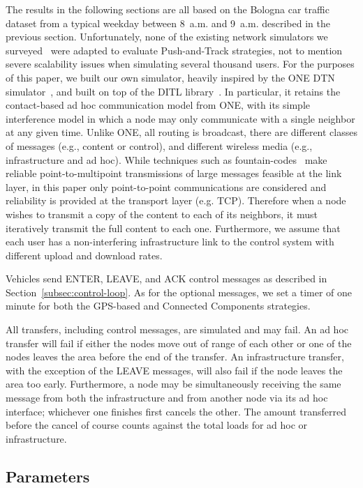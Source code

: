 \documentclass[preprint]{elsarticle}
\begin{document}
The results in the following sections are all based on the Bologna car traffic dataset from a typical weekday between 8~a.m. and 9~a.m. described in the previous section. Unfortunately, none of the existing network simulators we surveyed~\cite{ONE,ns3} were adapted to evaluate Push-and-Track strategies, not to mention severe scalability issues when simulating several thousand users. For the purposes of this paper, we built our own simulator, heavily inspired by the ONE DTN simulator~\cite{ONE}, and built on top of the DITL library~\cite{DITL}. In particular, it retains the contact-based ad hoc communication model from ONE, with its simple interference model in which a node may only communicate with a single neighbor at any given time. Unlike ONE, all routing is broadcast, there are different classes of messages (e.g., content or control), and different wireless media (e.g., infrastructure and ad hoc). While techniques such as fountain-codes~\cite{Luby2002} make reliable point-to-multipoint transmissions of large messages feasible at the link layer, in this paper only point-to-point communications are considered and reliability is provided at the transport layer (e.g. TCP). Therefore when a node wishes to transmit a copy of the content to each of its neighbors, it must iteratively transmit the full content to each one. Furthermore, we assume that each user has a non-interfering infrastructure link to the control system with different upload and download rates.

Vehicles send \textsf{ENTER}, \textsf{LEAVE}, and \textsf{ACK} control messages as described in Section~\ref{subsec:control-loop}. As for the optional messages, we set a timer of one minute for both the GPS-based and Connected Components strategies.

All transfers, including control messages, are simulated and may fail. An ad hoc transfer will fail if either the nodes move out of range of each other or one of the nodes leaves the area before the end of the transfer. An infrastructure transfer, with the exception of the \textsf{LEAVE} messages, will also fail if the node leaves the area too early. Furthermore, a node may be simultaneously receiving the same message from both the infrastructure and from another node via its ad hoc interface; whichever one finishes first cancels the other. The amount transferred before the cancel of course counts against the total loads for ad hoc or infrastructure.

\subsection{Parameters}
\label{subsec:exp_setup}
\end{document}
